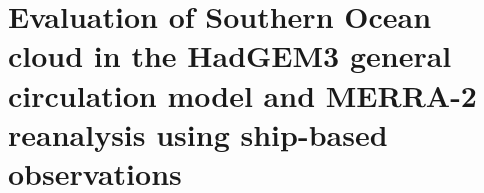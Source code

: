 \chapter{Evaluation of Southern Ocean cloud in the HadGEM3 general
circulation model and MERRA-2 reanalysis using ship-based
observations}
